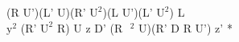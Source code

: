 (R U')(L' U)(R' $\text{U}^2$)(L U')(L' $\text{U}^2$) L\\
$\text{y}^2$ (R' $\text{U}^2$ R) U z D' (R$\text{ }^2$ U)(R' D R U') z' *\\
